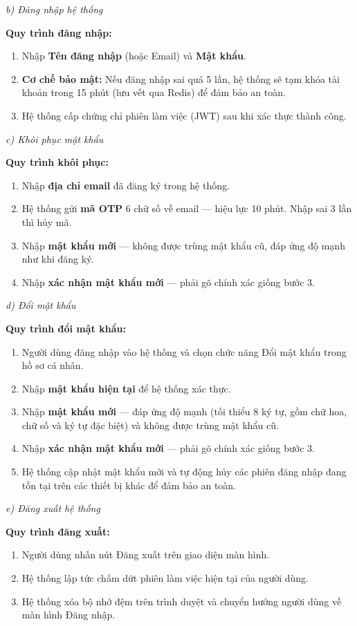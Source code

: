 \documentclass[12pt,a4paper]{article}
\begin{document}
\noindent\textit{b) Đăng nhập hệ thống}

\noindent\textbf{Quy trình đăng nhập:}
\begin{enumerate}
    \item Nhập \textbf{Tên đăng nhập} (hoặc Email) và \textbf{Mật khẩu}.
    \item \textbf{Cơ chế bảo mật:} Nếu đăng nhập sai quá 5 lần, hệ thống sẽ tạm khóa tài khoản trong 15 phút (lưu vết qua Redis) để đảm bảo an toàn.
    \item Hệ thống cấp chứng chỉ phiên làm việc (JWT) sau khi xác thực thành công.
\end{enumerate}

\noindent\textit{c) Khôi phục mật khẩu}

\noindent\textbf{Quy trình khôi phục:}
\begin{enumerate}
    \item Nhập \textbf{địa chỉ email} đã đăng ký trong hệ thống.
    \item Hệ thống gửi \textbf{mã OTP} 6 chữ số về email --- hiệu lực 10 phút. Nhập sai 3 lần thì hủy mã.
    \item Nhập \textbf{mật khẩu mới} --- không được trùng mật khẩu cũ, đáp ứng độ mạnh như khi đăng ký.
    \item Nhập \textbf{xác nhận mật khẩu mới} --- phải gõ chính xác giống bước 3.
\end{enumerate}

\noindent\textit{d) Đổi mật khẩu}

\noindent\textbf{Quy trình đổi mật khẩu:}
\begin{enumerate}
    \item Người dùng đăng nhập vào hệ thống và chọn chức năng Đổi mật khẩu trong hồ sơ cá nhân.
    \item Nhập \textbf{mật khẩu hiện tại} để hệ thống xác thực.
    \item Nhập \textbf{mật khẩu mới} --- đáp ứng độ mạnh (tối thiểu 8 ký tự, gồm chữ hoa, chữ số và ký tự đặc biệt) và không được trùng mật khẩu cũ.
    \item Nhập \textbf{xác nhận mật khẩu mới} --- phải gõ chính xác giống bước 3.
    \item Hệ thống cập nhật mật khẩu mới và tự động hủy các phiên đăng nhập đang tồn tại trên các thiết bị khác để đảm bảo an toàn.
\end{enumerate}

\noindent\textit{e) Đăng xuất hệ thống}

\noindent\textbf{Quy trình đăng xuất:}
\begin{enumerate}
    \item Người dùng nhấn nút Đăng xuất trên giao diện màn hình.
    \item Hệ thống lập tức chấm dứt phiên làm việc hiện tại của người dùng.
    \item Hệ thống xóa bộ nhớ đệm trên trình duyệt và chuyển hướng người dùng về màn hình Đăng nhập.
\end{enumerate}
\end{document}
